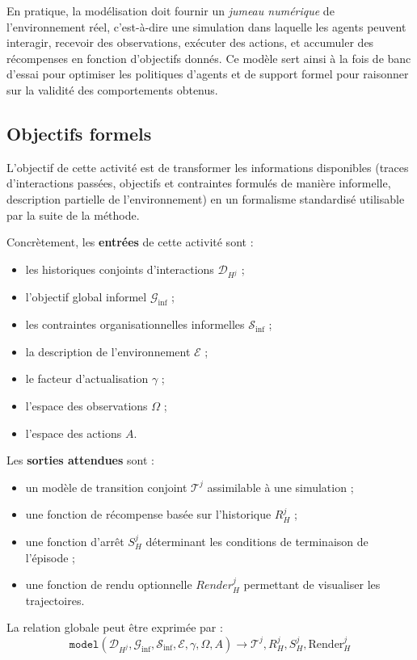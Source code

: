 En pratique, la modélisation doit fournir un \textit{jumeau numérique} de l'environnement réel, c'est-à-dire une simulation dans laquelle les agents peuvent interagir, recevoir des observations, exécuter des actions, et accumuler des récompenses en fonction d'objectifs donnés.
Ce modèle sert ainsi à la fois de banc d'essai pour optimiser les politiques d'agents et de support formel pour raisonner sur la validité des comportements obtenus.

\subsection*{Objectifs formels}
L'objectif de cette activité est de transformer les informations disponibles (traces d'interactions passées, objectifs et contraintes formulés de manière informelle, description partielle de l'environnement) en un formalisme standardisé utilisable par la suite de la méthode.

Concrètement, les \textbf{entrées} de cette activité sont :
\begin{itemize}
  \item les historiques conjoints d'interactions $\mathcal{D}_{H^j}$ ;
  \item l'objectif global informel $\mathcal{G}_{\text{inf}}$ ;
  \item les contraintes organisationnelles informelles $\mathcal{S}_{\text{inf}}$ ;
  \item la description de l'environnement $\mathcal{E}$ ;
  \item le facteur d'actualisation $\gamma$ ;
  \item l'espace des observations $\Omega$ ;
  \item l'espace des actions $A$.
\end{itemize}

Les \textbf{sorties attendues} sont :
\begin{itemize}
  \item un modèle de transition conjoint $\mathcal{T}^j$ assimilable à une simulation ;
  \item une fonction de récompense basée sur l'historique $R^j_H$ ;
  \item une fonction d'arrêt $S^j_H$ déterminant les conditions de terminaison de l'épisode ;
  \item une fonction de rendu optionnelle $Render^j_H$ permettant de visualiser les trajectoires.
\end{itemize}

La relation globale peut être exprimée par :
\begin{displaymath}
  \texttt{model}(\mathcal{D}_{H^j}, \mathcal{G}_{\text{inf}}, \mathcal{S}_{\text{inf}}, \mathcal{E}, \gamma, \Omega, A) \rightarrow \mathcal{T}^j, R^j_H, S^j_H, \text{Render}^j_H
\end{displaymath}

